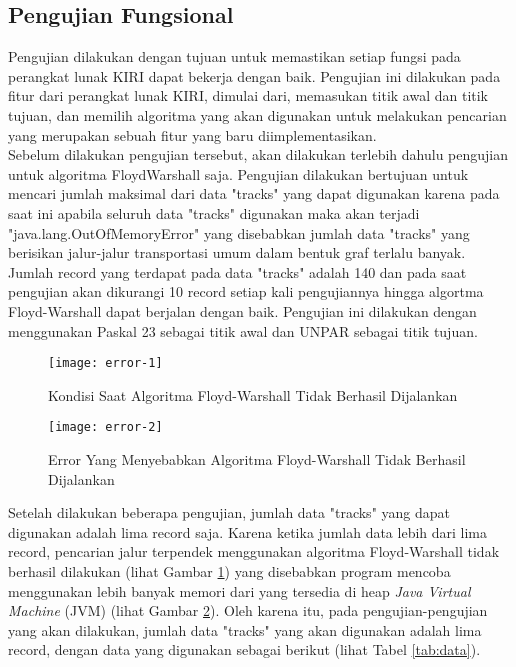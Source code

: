 \subsection{Pengujian Fungsional}
\label{subsec:pengujianfungsional}
Pengujian dilakukan dengan tujuan untuk memastikan setiap fungsi pada perangkat lunak KIRI dapat bekerja dengan baik. Pengujian ini dilakukan pada fitur dari perangkat lunak KIRI, dimulai dari, memasukan titik awal dan titik tujuan, dan memilih algoritma yang akan digunakan untuk melakukan pencarian yang merupakan sebuah fitur yang baru diimplementasikan.
\\
Sebelum dilakukan pengujian tersebut, akan dilakukan terlebih dahulu pengujian untuk algoritma FloydWarshall saja. Pengujian dilakukan bertujuan untuk mencari jumlah maksimal dari data "tracks" yang dapat digunakan karena pada saat ini apabila seluruh data "tracks" digunakan maka akan terjadi "java.lang.OutOfMemoryError" yang disebabkan jumlah data "tracks" yang berisikan jalur-jalur transportasi umum dalam bentuk graf terlalu banyak. Jumlah record yang terdapat pada data "tracks" adalah 140 dan pada saat pengujian akan dikurangi 10 record setiap kali pengujiannya hingga algortma Floyd-Warshall dapat berjalan dengan baik. Pengujian ini dilakukan dengan menggunakan Paskal 23 sebagai titik awal dan UNPAR sebagai titik tujuan.

\begin{figure}[H]
    \centering
    \texttt{[image: error-1]}
    \caption{Kondisi Saat Algoritma Floyd-Warshall Tidak Berhasil Dijalankan}
    \label{fig:error1}
\end{figure}

\begin{figure}[H]
    \centering
    \texttt{[image: error-2]}
    \caption{Error Yang Menyebabkan Algoritma Floyd-Warshall Tidak Berhasil Dijalankan}
    \label{fig:error2}
\end{figure}

\noindent
Setelah dilakukan beberapa pengujian, jumlah data "tracks" yang dapat digunakan adalah lima record saja. Karena ketika jumlah data lebih dari lima record, pencarian jalur terpendek menggunakan algoritma Floyd-Warshall tidak berhasil dilakukan (lihat Gambar \ref{fig:error1}) yang disebabkan program mencoba menggunakan lebih banyak memori dari yang tersedia di heap \textit{Java Virtual Machine} (JVM) (lihat Gambar \ref{fig:error2}). Oleh karena itu, pada pengujian-pengujian yang akan dilakukan, jumlah data "tracks" yang akan digunakan adalah lima record, dengan data yang digunakan sebagai berikut (lihat Tabel \ref{tab:data}).

